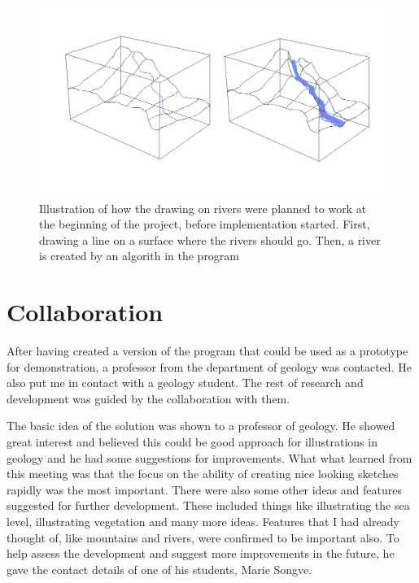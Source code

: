 \documentclass[a4paper,12pt]{report}
\begin{document}
\begin{figure}
 \includegraphics[width=\linewidth]{thesis/river.png}
 \caption{Illustration of how the drawing on rivers were planned to work at the beginning of the project, before implementation started. First, drawing a line on a surface where the rivers should go. Then, a river is created by an algorith in the program}
 \label{fig:riverDesription}
\end{figure}


\section{Collaboration}
After having created a version of the program that could be used as a prototype for demonstration, a professor from the department of geology was contacted. He also put me in contact with a geology student. The rest of research and development was guided by the collaboration with them. 

The basic idea of the solution was shown to a professor of geology. He showed great interest and believed this could be good approach for illustrations in geology and he had some suggestions for improvements. What what learned from this meeting was that the focus on the ability of creating nice looking sketches rapidly was the most important. There were also some other ideas and features suggested for further development. These included things like illustrating the sea level, illustrating vegetation and many more ideas. Features that I had already thought of, like mountains and rivers, were confirmed to be important also. To help assess the development and suggest more improvements in the future, he gave the contact details of one of his students, Marie Songve.

\end{document}
